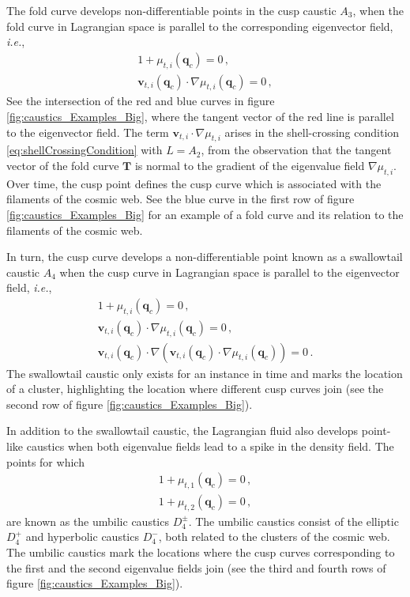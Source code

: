 \documentclass[a4paper, 11pt]{article}
\begin{document}
The fold curve develops non-differentiable points in the cusp caustic $A_3$, when the fold curve in Lagrangian space is parallel to the corresponding eigenvector field, \textit{i.e.}, 
\begin{align}
1+\mu_{t,i}(\bm{q}_c)=0\,,\\
\bm{v}_{t,i}(\bm{q}_c) \cdot \nabla \mu_{t,i}(\bm{q}_c)=0\,,\label{eq:cuspCondition}
\end{align}
See the intersection of the red and blue curves in figure \ref{fig:caustics_Examples_Big}, where the tangent vector of the red line is parallel to the eigenvector field. The term $\bm{v}_{t,i} \cdot \nabla \mu_{t,i}$ arises in the shell-crossing condition \eqref{eq:shellCrossingCondition} with $L=A_2$, from the observation that the tangent vector of the fold curve $\bm{T}$ is normal to the gradient of the eigenvalue field $\nabla \mu_{t,i}$. Over time, the cusp point defines the cusp curve which is associated with the filaments of the cosmic web. See the blue curve in the first row of figure \ref{fig:caustics_Examples_Big} for an example of a fold curve and its relation to the filaments of the cosmic web. 

In turn, the cusp curve develops a non-differentiable point known as a swallowtail caustic $A_4$ when the cusp curve in Lagrangian space is parallel to the eigenvector field, \textit{i.e.},
\begin{align}
1+\mu_{t,i}(\bm{q}_c)=0\,,\\
\bm{v}_{t,i}(\bm{q}_c) \cdot \nabla \mu_{t,i}(\bm{q}_c)=0\,,\\
\bm{v}_{t,i}(\bm{q}_c) \cdot \nabla (\bm{v}_{t,i}(\bm{q}_c) \cdot \nabla \mu_{t,i}(\bm{q}_c)) = 0\,.
\end{align}
The swallowtail caustic only exists for an instance in time and marks the location of a cluster, highlighting the location where different cusp curves join (see the second row of figure \ref{fig:caustics_Examples_Big}). 

In addition to the swallowtail caustic, the Lagrangian fluid also develops point-like caustics when both eigenvalue fields lead to a spike in the density field. The points for which
\begin{align}
1+\mu_{t,1}(\bm{q}_c) =0\,,\\
1+\mu_{t,2}(\bm{q}_c) = 0\,,
\end{align}
are known as the umbilic caustics $D_4^\pm$. The umbilic caustics consist of the elliptic $D_4^+$ and hyperbolic caustics $D_4^-$, both related to the clusters of the cosmic web. The umbilic caustics mark the locations where the cusp curves corresponding to the first and the second eigenvalue fields join (see the third and fourth rows of figure \ref{fig:caustics_Examples_Big}). 
\end{document}

